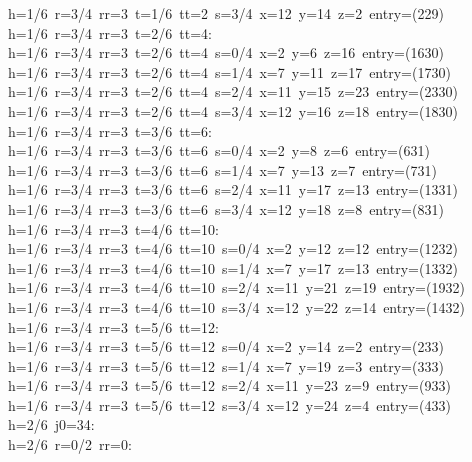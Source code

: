\begin{tabbing}
h=1/6\ r=3/4\ rr=3\ t=1/6\ tt=2\ s=3/4\ x=12\ y=14\ z=2\ entry=(229)\\[0pt]
h=1/6\ r=3/4\ rr=3\ t=2/6\ tt=4:\\[0pt]
h=1/6\ r=3/4\ rr=3\ t=2/6\ tt=4\ s=0/4\ x=2\ y=6\ z=16\ entry=(1630)\\[0pt]
h=1/6\ r=3/4\ rr=3\ t=2/6\ tt=4\ s=1/4\ x=7\ y=11\ z=17\ entry=(1730)\\[0pt]
h=1/6\ r=3/4\ rr=3\ t=2/6\ tt=4\ s=2/4\ x=11\ y=15\ z=23\ entry=(2330)\\[0pt]
h=1/6\ r=3/4\ rr=3\ t=2/6\ tt=4\ s=3/4\ x=12\ y=16\ z=18\ entry=(1830)\\[0pt]
h=1/6\ r=3/4\ rr=3\ t=3/6\ tt=6:\\[0pt]
h=1/6\ r=3/4\ rr=3\ t=3/6\ tt=6\ s=0/4\ x=2\ y=8\ z=6\ entry=(631)\\[0pt]
h=1/6\ r=3/4\ rr=3\ t=3/6\ tt=6\ s=1/4\ x=7\ y=13\ z=7\ entry=(731)\\[0pt]
h=1/6\ r=3/4\ rr=3\ t=3/6\ tt=6\ s=2/4\ x=11\ y=17\ z=13\ entry=(1331)\\[0pt]
h=1/6\ r=3/4\ rr=3\ t=3/6\ tt=6\ s=3/4\ x=12\ y=18\ z=8\ entry=(831)\\[0pt]
h=1/6\ r=3/4\ rr=3\ t=4/6\ tt=10:\\[0pt]
h=1/6\ r=3/4\ rr=3\ t=4/6\ tt=10\ s=0/4\ x=2\ y=12\ z=12\ entry=(1232)\\[0pt]
h=1/6\ r=3/4\ rr=3\ t=4/6\ tt=10\ s=1/4\ x=7\ y=17\ z=13\ entry=(1332)\\[0pt]
h=1/6\ r=3/4\ rr=3\ t=4/6\ tt=10\ s=2/4\ x=11\ y=21\ z=19\ entry=(1932)\\[0pt]
h=1/6\ r=3/4\ rr=3\ t=4/6\ tt=10\ s=3/4\ x=12\ y=22\ z=14\ entry=(1432)\\[0pt]
h=1/6\ r=3/4\ rr=3\ t=5/6\ tt=12:\\[0pt]
h=1/6\ r=3/4\ rr=3\ t=5/6\ tt=12\ s=0/4\ x=2\ y=14\ z=2\ entry=(233)\\[0pt]
h=1/6\ r=3/4\ rr=3\ t=5/6\ tt=12\ s=1/4\ x=7\ y=19\ z=3\ entry=(333)\\[0pt]
h=1/6\ r=3/4\ rr=3\ t=5/6\ tt=12\ s=2/4\ x=11\ y=23\ z=9\ entry=(933)\\[0pt]
h=1/6\ r=3/4\ rr=3\ t=5/6\ tt=12\ s=3/4\ x=12\ y=24\ z=4\ entry=(433)\\[0pt]
h=2/6\ j0=34:\\[0pt]
h=2/6\ r=0/2\ rr=0:\\[0pt]

\end{tabbing}
